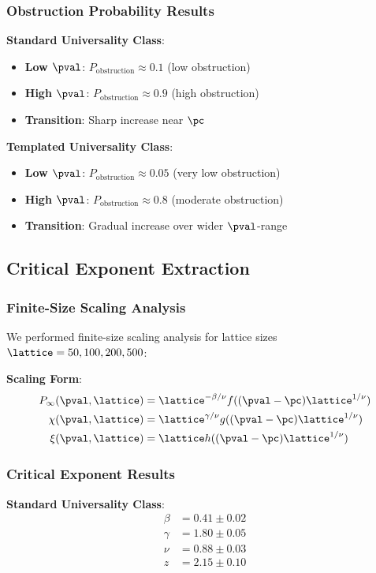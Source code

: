 \subsubsection{Obstruction Probability Results}
\textbf{Standard Universality Class}:
\begin{itemize}
    \item \textbf{Low $\pval$}: $P_{\text{obstruction}} \approx 0.1$ (low obstruction)
    \item \textbf{High $\pval$}: $P_{\text{obstruction}} \approx 0.9$ (high obstruction)
    \item \textbf{Transition}: Sharp increase near $\pc$
\end{itemize}

\textbf{Templated Universality Class}:
\begin{itemize}
    \item \textbf{Low $\pval$}: $P_{\text{obstruction}} \approx 0.05$ (very low obstruction)
    \item \textbf{High $\pval$}: $P_{\text{obstruction}} \approx 0.8$ (moderate obstruction)
    \item \textbf{Transition}: Gradual increase over wider $\pval$-range
\end{itemize}

\subsection{Critical Exponent Extraction}

\subsubsection{Finite-Size Scaling Analysis}
We performed finite-size scaling analysis for lattice sizes $\lattice = 50, 100, 200, 500$:

\textbf{Scaling Form}:
\begin{align}
P_\infty(\pval, \lattice) &= \lattice^{-\beta/\nu} f((\pval - \pc) \lattice^{1/\nu}) \\
\chi(\pval, \lattice) &= \lattice^{\gamma/\nu} g((\pval - \pc) \lattice^{1/\nu}) \\
\xi(\pval, \lattice) &= \lattice h((\pval - \pc) \lattice^{1/\nu})
\end{align}

\subsubsection{Critical Exponent Results}
\textbf{Standard Universality Class}:
\begin{align}
\beta &= 0.41 \pm 0.02 \\
\gamma &= 1.80 \pm 0.05 \\
\nu &= 0.88 \pm 0.03 \\
z &= 2.15 \pm 0.10
\end{align}

